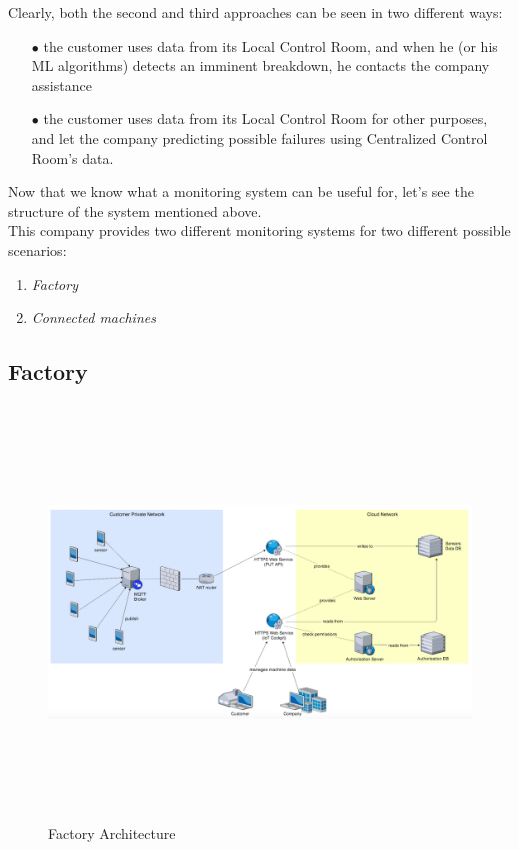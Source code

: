 \documentclass[12pt]{report}
\begin{document}
{Clearly, both the second and third approaches can be seen in two different ways:

\begin{itemize}
\setlength{\itemindent}{+4mm}
\item[$\bullet$] the customer uses data from its Local Control Room, and when he (or his ML algorithms) detects an imminent breakdown, he contacts the company assistance
\item[$\bullet$] the customer uses data from its Local Control Room for other purposes, and let the company predicting possible failures using Centralized Control Room's data.\\
\end{itemize}

Now that we know what a monitoring system can be useful for, let's see the structure of the system mentioned above.\\

This company provides two different monitoring systems for two different possible scenarios:
\bigskip
\begin{enumerate}
\setlength{\itemindent}{+5mm}
\item \emph{Factory}
\item \emph{Connected machines}
\end{enumerate}

\clearpage
\subsection{Factory}

\begin{figure}[H]
\includegraphics[width=15cm,height=11cm,keepaspectratio]{factory_architecture}
\centering
\caption{Factory Architecture}
\end{figure}

}
\end{document}
